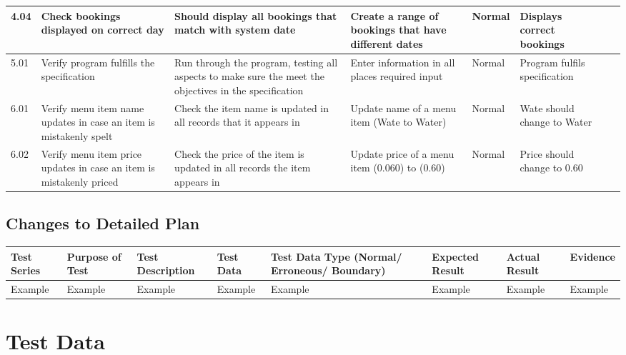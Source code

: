 \begin{landscape}
\begin{center}
\begin{longtable}{|p{1.5cm}|p{2.5cm}|p{2.5cm}|p{2cm}|p{2cm}|p{2cm}|p{2cm}|p{2cm}|}
	4.04 & Check bookings displayed on correct day & Should display all bookings that match with system date & Create a range of bookings that have different dates & Normal& Displays correct bookings & & \\ \hline
         5.01 & Verify program fulfills the specification & Run through the program, testing all aspects to make sure the meet the objectives in the specification & Enter information in all places required input &  Normal & Program fulfils specification  & & \\ \hline
	6.01 & Verify menu item name updates in case an item is mistakenly spelt & Check  the item name is updated in all records that it appears in & Update name of a menu item (Wate to Water) & Normal & Wate should change to Water & & \\ \hline
	6.02 & Verify menu item price updates in case an item is mistakenly priced & Check the price of the item is updated in all records the item appears in & Update price of a menu item (0.060) to (0.60) & Normal & Price should change to 0.60 & & \\ \hline
	






    \end{longtable}
\end{center}

\subsection{Changes to Detailed Plan}

\begin{center}
    \begin{longtable}{|p{1.5cm}|p{2.5cm}|p{2.5cm}|p{2cm}|p{2cm}|p{2cm}|p{2cm}|p{2cm}|}
        \hline
        \textbf{Test Series} & \textbf{Purpose of Test} & \textbf{Test Description} & \textbf{Test Data} & \textbf{Test Data Type (Normal/ Erroneous/ Boundary)} & \textbf{Expected Result} & \textbf{Actual Result} & \textbf{Evidence}\\ \hline
        Example & Example & Example & Example & Example & Example & Example & Example \\ \hline
    \end{longtable}
\end{center}

\section{Test Data}


\end{landscape}
